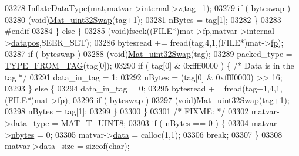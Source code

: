 \begin{DoxyCode}
{{{{{{{{{{{{{{{{03278                     InflateDataType(mat,matvar->\hyperlink{group___m_a_t_a6e97e3ed9f40c49322c18561c2a94e92}{internal}->z,tag+1);
03279                     \textcolor{keywordflow}{if} ( byteswap )
03280                         (void)\hyperlink{endian_8c_a8cb0d0750e2eaf9840d95db531934f4f}{Mat\_uint32Swap}(tag+1);
03281                     nBytes = tag[1];
03282                 \}
03283 \textcolor{preprocessor}{#endif}
03284             \} \textcolor{keywordflow}{else} \{
03285                 (void)fseek((FILE*)mat->\hyperlink{struct__mat__t_a85f562e407ca9ad4d2a6e14f839432b7}{fp},matvar->\hyperlink{group___m_a_t_a6e97e3ed9f40c49322c18561c2a94e92}{internal}->\hyperlink{structmatvar__internal_afd3bfaab126a160bd6855563e1ea0a7e}{datapos},SEEK\_SET);
03286                 bytesread += fread(tag,4,1,(FILE*)mat->\hyperlink{struct__mat__t_a85f562e407ca9ad4d2a6e14f839432b7}{fp});
03287                 \textcolor{keywordflow}{if} ( byteswap )
03288                     (void)\hyperlink{endian_8c_a8cb0d0750e2eaf9840d95db531934f4f}{Mat\_uint32Swap}(tag);
03289                 packed\_type = \hyperlink{mat5_8c_a82bacecc4afc633b61bc3dc8ef88d1ed}{TYPE\_FROM\_TAG}(tag[0]);
03290                 \textcolor{keywordflow}{if} ( tag[0] & 0xffff0000 ) \{ \textcolor{comment}{/* Data is in the tag */}
03291                     data\_in\_tag = 1;
03292                     nBytes = (tag[0] & 0xffff0000) >> 16;
03293                 \} \textcolor{keywordflow}{else} \{
03294                     data\_in\_tag = 0;
03295                     bytesread += fread(tag+1,4,1,(FILE*)mat->\hyperlink{struct__mat__t_a85f562e407ca9ad4d2a6e14f839432b7}{fp});
03296                     \textcolor{keywordflow}{if} ( byteswap )
03297                         (void)\hyperlink{endian_8c_a8cb0d0750e2eaf9840d95db531934f4f}{Mat\_uint32Swap}(tag+1);
03298                     nBytes = tag[1];
03299                 \}
03300             \}
03301             \textcolor{comment}{/* FIXME: */}
03302             matvar->\hyperlink{group___m_a_t_ab6aafe9bd77f0f077852593dec438144}{data\_type} = \hyperlink{group___m_a_t_ggacf7b3b879282b7ab3a51190e49bf3453a01c1bd7db68f90552862eb5d311be408}{MAT\_T\_UINT8};
03303             \textcolor{keywordflow}{if} ( nBytes == 0 ) \{
03304                 matvar->\hyperlink{group___m_a_t_abf1c844540503be2df9bb3db93cfe307}{nbytes} = 0;
03305                 matvar->\hyperlink{group___m_a_t_a5672978efa230bbdecdf38ede781f7fa}{data}   = calloc(1,1);
03306                 \textcolor{keywordflow}{break};
03307             \}
03308             matvar->\hyperlink{group___m_a_t_a9ad1c82e2b568da617e12dc73a26e1f9}{data\_size} = \textcolor{keyword}{sizeof}(char);
}}}}}}}}}}}}}}}}
\end{DoxyCode}
